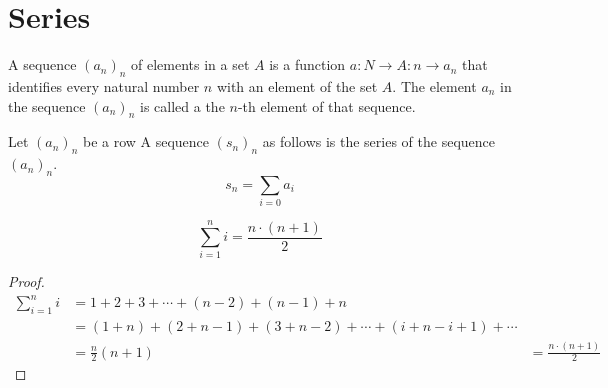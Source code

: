 \documentclass[main.tex]{subfiles}
\begin{document}
\chapter{Series}

\begin{de}
    A sequence $(a_{n})_{n}$ of elements in a set $A$ is a function $a: N
    \rightarrow A: n \rightarrow a_{n}$ that identifies every natural number $n$ with an element of
    the set $A$. The element $a_{n}$ in the sequence $(a_{n})_{n}$ is called a the
    $n$-th element of that sequence.
\end{de}

\begin{de}
    Let $(a_{n})_{n}$ be a row
    A sequence $(s_{n})_{n}$ as follows is the series of the sequence $(a_{n})_{n}$.
    \[ s_{n} = \sum_{i=0}a_{i} \]
\end{de}

\begin{pr}
    \label{pr:sum-of-first-n-natural-numbers}
    \[
        \sum_{i=1}^n i = \frac{n\cdot(n+1)}{2}
    \]
    \begin{proof}
        \begin{align*}
            \sum_{i=1}^n i
            &= 1 + 2 + 3 + \dotsb + (n-2) + (n-1) + n\\
            &= (1 + n) + (2+n-1) + (3+n-2) + \dotsb + (i+n-i+1) + \dotsb\\
            &= \frac{n}{2} (n+1)
            &= \frac{n\cdot(n+1)}{2}
        \end{align*}
    \end{proof}
\end{pr}
\end{document}
